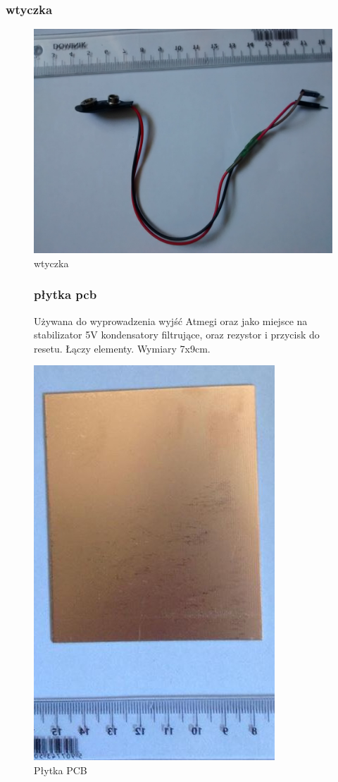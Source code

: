 \documentclass[a4paper,11pt]{article}
\def\SCALE{0.6}
\begin{document}
\subsubsection{wtyczka}
\begin{figure}[H]
	\centering
	\includegraphics[width=\SCALE
	\paperwidth]{zlaczka}
	\caption{wtyczka}
\end{figure}


\begin{figure}[H]

	\subsubsection{płytka pcb}
Używana do wyprowadzenia wyjść Atmegi oraz jako miejsce na stabilizator 5V kondensatory filtrujące,	oraz rezystor i przycisk do resetu. Łączy elementy. Wymiary 7x9cm.

	\centering
	\includegraphics[width=\SCALE
	\paperwidth]{plytka}
	\caption{Płytka PCB}
\end{figure}
\end{document}
